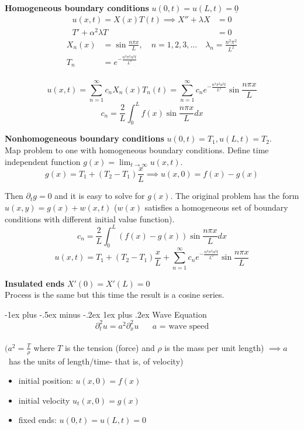 \documentclass[10pt,landscape]{article}
\makeatletter
\newcommand{\lb}{\lambda}
\newcommand{\f}{\frac}
\renewcommand{\subsubsection}{\@startsection{subsubsection}{3}{0mm}%
                                {-1ex plus -.5ex minus -.2ex}%
                                {1ex plus .2ex}%
                                {\normalfont\small\bfseries}}
\makeatother
\begin{document}
\begin{multicols}{2}
		
		\textbf{Homogeneous boundary conditions} $u(0,t) =  u(L,t) = \underline{0}$\\
		\begin{align*}
			u(x,t) = X(x)T(t) \implies X''+\lb X &= 0 \\ T'+\alpha^2 \lb T &= 0 
		\end{align*}
		\begin{align*}
			X_n(x) &= \sin{\f{n \pi x}{L}}, \quad n=1,2,3,... \quad \lb_n = \f{n^2 \pi^2 }{L^2} \\
			T_n &= e^{-\f{n^2 \pi^2 \alpha^2 t}{L^2}}
		\end{align*}\\
		$$ u(x,t) = \sum_{n=1}^{\infty} c_nX_n(x)T_n(t) = \sum_{n=1}^{\infty} c_n e^{-\f{n^2 \pi^2 \alpha^2 t}{L^2}} \sin{\f{n \pi x}{L}} $$
		$$ c_n = \f{2}{L} \int_0^L f(x)  \sin{\f{n \pi x}{L}} dx $$

		\textbf{Nonhomogeneous boundary conditions} $u(0,t) =  T_1, u(L,t) = T_2$. \\
		Map problem to one with homogeneous boundary conditions. Define time independent function $g(x) = \lim_{t \rightarrow \infty}u(x,t).$ \\
		$$g(x) = T_1 +(T_2-T_1)\f{x}{L} \implies u(x,0) = f(x)-g(x)$$

        Then $\partial_t g = 0$ and it is easy to solve for $g(x)$. The original problem has the form $u(x,y) = g(x) + w(x,t)$ ($w(x)$ satisfies a homogeneous set of boundary conditions with different initial value function). \\
		$$ c_n = \f{2}{L} \int_0^L (f(x)-g(x))  \sin{\f{n \pi x}{L}} dx$$
		$$ u(x,t)  = T_1 + (T_2-T_1)\f{x}{L}  + \sum_{n=1}^{\infty} c_n e^{-\f{n^2 \pi^2 \alpha^2 t}{L^2}} \sin{\f{n \pi x}{L}} $$

		\textbf{Insulated ends} $X'(0) = X'(L) = 0$ \\ Process is the same but this time the result is a cosine series. 

		\subsubsection{Wave Equation}
		$$\partial_t^2 u = a^2 \partial_x^2 u \quad \text{ $a$ = wave speed}$$ \\ $(a^2 = \frac{T}{\rho}$  where  $T$ is the tension (force) and  $\rho$  is the mass per unit length) $\implies a$ \ has the units of length/time- that is, of velocity)
		\begin{itemize}
			\item initial position: $u(x,0) = f(x)$ \\
			\item initial velocity $u_t(x,0) = g(x)$ \\
			\item fixed ends: $u(0,t) = u(L,t) = 0 $ 
		\end{itemize}
		

\end{multicols}
\end{document}
